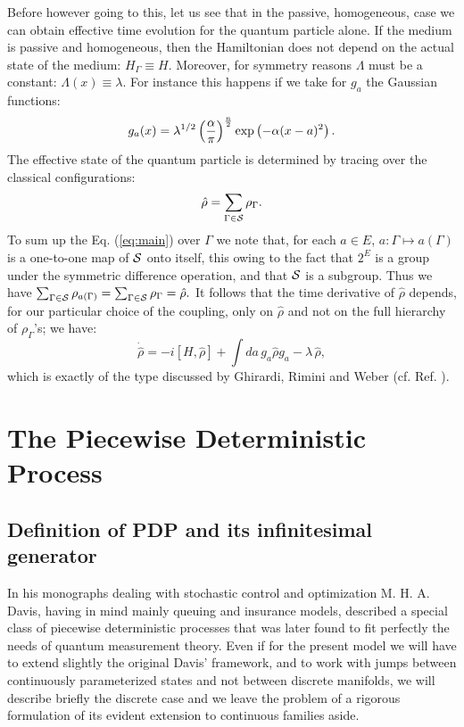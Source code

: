 \documentclass[12pt]{article}
\def\be{\begin{equation}}
\def\ee{\end{equation}}
\begin{document}
Before however going to this, let us see that in the passive, homogeneous,
case we can obtain effective time evolution for the quantum particle alone.
If the medium is passive and homogeneous, then the Hamiltonian does not
depend on the actual state of the medium: $H_\Gamma\equiv H$. Moreover, for
symmetry reasons $\Lambda$ must be a constant: $\Lambda(x)\equiv\lambda$.
For instance this happens if we take for $g_a$ the Gaussian functions: \be
g_a(x)=\lambda^{1/2}\left({\alpha\over\pi}\right)^{n\over 2}
\exp\left({-\alpha (x-a)^2}\right). \ee The effective state of the quantum
particle is determined by tracing over the classical configurations: \be
{\hat\rho}=\sum_{\Gamma\in{\cal S}} \rho_\Gamma. \ee To sum up the Eq.
(\ref{eq:main}) over $\Gamma$ we note that, for each $a\in E$,
$a:\Gamma\mapsto a(\Gamma)$ is a one-to-one map of ${\cal S}$ onto
itself, this owing to the fact that $2^E$ is a group under the
symmetric difference operation, and that ${\cal S}$ is a subgroup. Thus
we have $\sum_{\Gamma\in{\cal S}}\rho_{a(\Gamma)}= \sum_{\Gamma\in{\cal
S}}\rho_\Gamma={\hat\rho}.$ It follows that the time derivative of
${\hat\rho}$ depends, for our particular choice of the coupling, only on
${\hat\rho}$ and not on the full hierarchy of $\rho_\Gamma$'s; we have: \be
{\dot {\hat\rho}} = -i[H,{\hat\rho}]+\int da\, g_a{\hat\rho} g_a -\lambda\,
{\hat\rho },\ee which is exactly of the type discussed by Ghirardi, Rimini
and Weber (cf. Ref. \cite{ghi1}).

\section{The Piecewise Deterministic Process}\label{pdp}
\subsection{Definition of  PDP  and its infinitesimal generator}
In his monographs \cite{davmha1,davmha2} dealing with stochastic control
and optimization M. H. A. Davis, having in mind mainly queuing and
insurance models, described a special class of piecewise deterministic
processes that was later found to fit perfectly the needs of quantum
measurement theory. Even if for the present model we will have to extend
slightly the original Davis' framework, and to work with jumps between
continuously parameterized states and not between discrete manifolds, we
will describe briefly the discrete case and we leave the problem of a
rigorous formulation of its evident extension to continuous families
aside.
\end{document}
